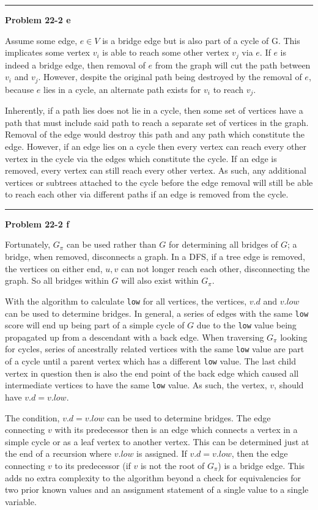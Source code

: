 \documentclass{article}
\newcommand\separator{\rule{\textwidth}{.2pt}}  %
\begin{document}
\separator

\textbf{Problem 22-2 e} 

Assume some edge, $e \in V$ is a bridge edge but is also part of a cycle of G. 
This implicates some vertex $v_i$ is able to reach some other vertex $v_j$ via 
$e$. If $e$ is indeed a bridge edge, then removal of $e$ from the graph will cut
the path between $v_i$ and $v_j$. However, despite the original path being 
destroyed by the removal of $e$, because $e$ lies in a cycle, an alternate path 
exists for $v_i$ to reach $v_j$. 

Inherently, if a path lies does not lie in a cycle, then some set of vertices 
have a path that must include said path to reach a separate set of vertices in 
the graph. Removal of the edge would destroy this path and any path which 
constitute the edge. However, if an edge lies on a cycle then every vertex can 
reach every other vertex in the cycle via the edges which constitute the cycle. 
If an edge is removed, every vertex can still reach every other vertex. As such,
any additional vertices or subtrees attached to the cycle before the edge 
removal will still be able to reach each other via different paths if an edge is
removed from the cycle. 

\separator

\textbf{Problem 22-2 f} 

Fortunately, $G_\pi$ can be used rather than $G$ for determining all bridges of 
$G$; a bridge, when removed, disconnects a graph. In a DFS, if a tree edge is 
removed, the vertices on either end, $u, v$ can not longer reach each other,
disconnecting the graph. So all bridges within $G$ will also exist within 
$G_\pi$. 

With the algorithm to calculate \texttt{low} for all vertices, the vertices, 
$v.d$ and $v.low$ can be used to determine bridges. In general, a series of 
edges with the same \texttt{low} score will end up being part of a simple cycle
of $G$ due to the \texttt{low} value being propagated up from a descendant with 
a back edge. When traversing $G_\pi$ looking for cycles, series of ancestrally 
related vertices with the same \texttt{low} value are part of a cycle until a 
parent vertex which has a different \texttt{low} value. The last child vertex 
in question then is also the end point of the back edge which caused all 
intermediate vertices to have the same \texttt{low} value. As such, the vertex,
$v$, should have $v.d = v.low$. 

The condition, $v.d = v.low$ can be used to determine bridges. The edge 
connecting $v$ with its predecessor then is an edge which connects a vertex in 
a simple cycle or as a leaf vertex to another vertex. This can be determined 
just at the end of a recursion where $v.low$ is assigned. If $v.d = v.low$, then
the edge connecting $v$ to its predecessor (if $v$ is not the root of $G_\pi$)
is a bridge edge. This adds no extra complexity to the algorithm beyond a check
for equivalencies for two prior known values and an assignment statement of a
single value to a single variable. 
\end{document}

